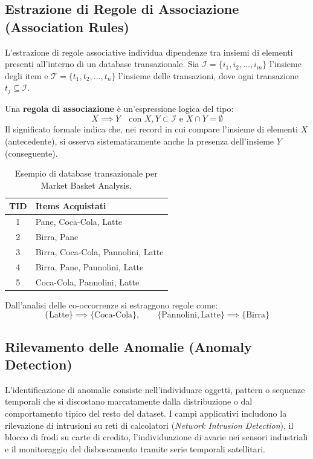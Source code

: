 \FloatBarrier
\subsection{Estrazione di Regole di Associazione (Association Rules)}
L'estrazione di regole associative individua dipendenze tra insiemi di elementi presenti all'interno di un database transazionale. Sia $\mathcal{I} = \{i_1, i_2, \dots, i_m\}$ l'insieme degli item e $\mathcal{T} = \{t_1, t_2, \dots, t_n\}$ l'insieme delle transazioni, dove ogni transazione $t_j \subseteq \mathcal{I}$.

Una \textbf{regola di associazione} \`e un'espressione logica del tipo:
\begin{equation}
    X \implies Y \quad \text{con } X, Y \subset \mathcal{I} \text{ e } X \cap Y = \emptyset
\end{equation}
Il significato formale indica che, nei record in cui compare l'insieme di elementi $X$ (antecedente), si osserva sistematicamente anche la presenza dell'insieme $Y$ (conseguente).

\begin{table}[H]
\centering
\small
\begin{tabular}{c l}
\toprule
\textbf{TID} & \textbf{Items Acquistati} \\
\midrule
1 & Pane, Coca-Cola, Latte \\
2 & Birra, Pane \\
3 & Birra, Coca-Cola, Pannolini, Latte \\
4 & Birra, Pane, Pannolini, Latte \\
5 & Coca-Cola, Pannolini, Latte \\
\bottomrule
\end{tabular}
\caption{Esempio di database transazionale per Market Basket Analysis.}
\label{tab:market-basket}
\end{table}

Dall'analisi delle co-occorrenze si estraggono regole come:
\begin{equation}
    \{\text{Latte}\} \implies \{\text{Coca-Cola}\}, \qquad \{\text{Pannolini}, \text{Latte}\} \implies \{\text{Birra}\}
\end{equation}

\FloatBarrier
\subsection{Rilevamento delle Anomalie (Anomaly Detection)}
L'identificazione di anomalie consiste nell'individuare oggetti, pattern o sequenze temporali che si discostano marcatamente dalla distribuzione o dal comportamento tipico del resto del dataset. I campi applicativi includono la rilevazione di intrusioni su reti di calcolatori (\textit{Network Intrusion Detection}), il blocco di frodi su carte di credito, l'individuazione di avarie nei sensori industriali e il monitoraggio del disboscamento tramite serie temporali satellitari.

